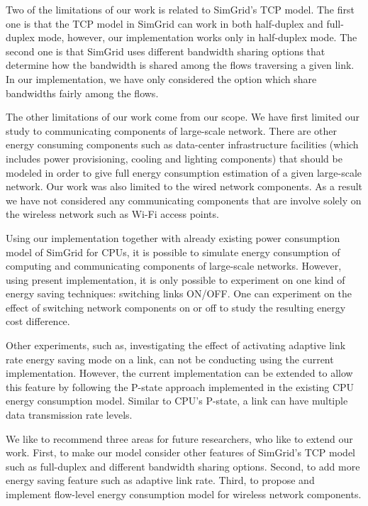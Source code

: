 Two of the limitations of our work is related to SimGrid's TCP model. The first one is that the TCP model in SimGrid can work in both half-duplex and full-duplex mode, however, our implementation works only in half-duplex mode. The second one  is that SimGrid uses different bandwidth sharing options that determine how the bandwidth is shared among the flows traversing a given link. In our implementation, we have only considered the option which share bandwidths fairly among the flows. 

The other limitations of our work come from our scope. We have first limited our study to communicating components of large-scale network. There are other energy consuming components such as data-center infrastructure facilities (which includes power provisioning, cooling and lighting components) that should be modeled in order to give full energy consumption estimation of a given large-scale network. Our work was also limited to the wired network components. As a result we have not considered any communicating components that are involve solely on the wireless network such as Wi-Fi access points. 

Using our implementation together with already existing power consumption model of SimGrid for CPUs, it is possible to simulate energy consumption of computing and communicating components of large-scale networks. However, using present implementation, it is only possible to experiment on one kind of energy saving techniques: switching links ON/OFF. One can experiment on the effect of switching network components on or off to study the resulting energy cost difference. 

Other experiments, such as, investigating the effect of activating adaptive link rate energy saving mode on a link, can not be conducting using the current implementation. However, the current implementation can be extended to allow this feature by following the P-state approach implemented in the existing CPU energy consumption model. Similar to CPU's P-state, a link can have multiple data transmission rate levels. 

We like to recommend three areas for future researchers, who like to extend our work. First, to make our model consider other features of SimGrid's TCP model such as full-duplex and different bandwidth sharing options.  Second, to add more energy saving feature such as adaptive link rate. Third, to propose and implement flow-level energy consumption model for wireless network components. 
